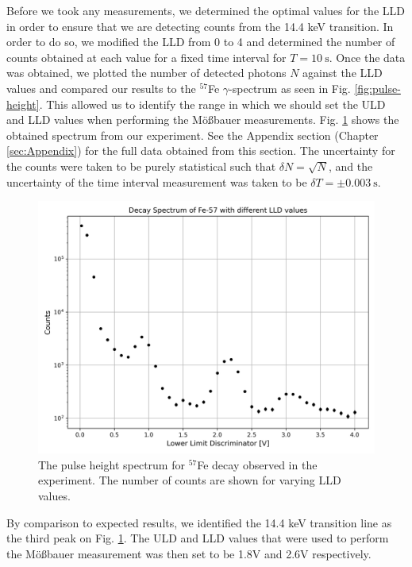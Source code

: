 \documentclass[a4paper]{report}
\numberwithin{equation}{section}
\begin{document}
Before we took any measurements, we determined the optimal values for the LLD in order to ensure that we are 
detecting counts from the 14.4 keV transition. In order to do so, we modified the LLD from 0 to 4 and determined the number 
of counts obtained at each value for a fixed time interval for $T = \SI{10}{\second}$. Once the data was obtained, 
we plotted the number of detected photons $N$ against the LLD values and compared our results to the $^{57}$Fe $\gamma$-spectrum as seen in Fig. \ref{fig:pulse-height}.
This allowed us to identify the range in which we should set the ULD and LLD values when performing the M\"o{\ss}bauer measurements. 
 Fig. \ref{fig:calibration_plot} shows the obtained spectrum from our experiment. See the Appendix section (Chapter \ref{sec:Appendix}) for the full data obtained from this section. The uncertainty for the counts were taken to be purely statistical such that $\delta N = \sqrt{N}$, and the uncertainty 
 of the time interval measurement was taken to be $\delta T = \pm \SI{0.003}{\second}$. \par

\begin{figure}[htb!]
	\centering
	\includegraphics[width=0.7\columnwidth]{calib_plot.png}
	\caption{The pulse height spectrum for $^{57}$Fe decay observed in the experiment. The number of counts are shown for varying 
	LLD values.}
	\label{fig:calibration_plot}
\end{figure}

By comparison to expected results, we identified the 14.4 keV transition line as the third peak on Fig. \ref{fig:calibration_plot}. 
The ULD and LLD values that were used to perform the M\"o{\ss}bauer measurement was then set to be 1.8V and 2.6V respectively. \par 

\end{document}
